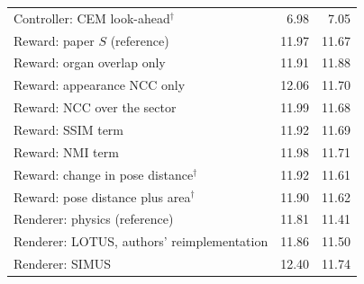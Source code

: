 \begin{table}[tbp]
\begin{tabular}{@{}l rr@{}}
Controller: CEM look-ahead$^{\dagger}$ & 6.98 & 7.05 \\
Reward: paper $S$ (reference) & 11.97 & 11.67 \\
Reward: organ overlap only & 11.91 & 11.88 \\
Reward: appearance NCC only & 12.06 & 11.70 \\
Reward: NCC over the sector & 11.99 & 11.68 \\
Reward: SSIM term & 11.92 & 11.69 \\
Reward: NMI term & 11.98 & 11.71 \\
Reward: change in pose distance$^{\dagger}$ & 11.92 & 11.61 \\
Reward: pose distance plus area$^{\dagger}$ & 11.90 & 11.62 \\
Renderer: physics (reference) & 11.81 & 11.41 \\
Renderer: LOTUS, authors' reimplementation & 11.86 & 11.50 \\
Renderer: SIMUS & 12.40 & 11.74 \\
\bottomrule
\end{tabular}
\end{table}

